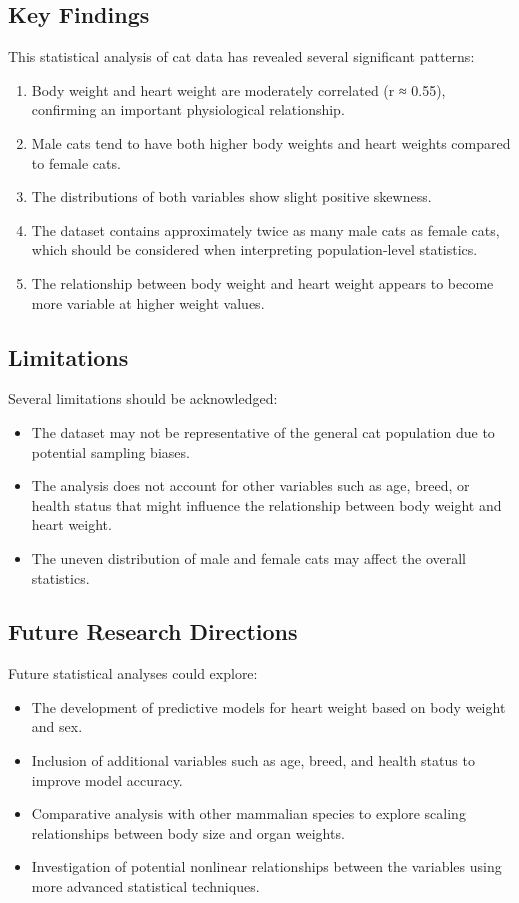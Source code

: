 \documentclass[a4paper,12pt]{article}
\begin{document}
\subsection{Key Findings}
\label{subsec:findings}

This statistical analysis of cat data has revealed several significant patterns:

\begin{enumerate}[leftmargin=1.5cm]
    \item Body weight and heart weight are moderately correlated (r ≈ 0.55), confirming an important physiological relationship.
    \item Male cats tend to have both higher body weights and heart weights compared to female cats.
    \item The distributions of both variables show slight positive skewness.
    \item The dataset contains approximately twice as many male cats as female cats, which should be considered when interpreting population-level statistics.
    \item The relationship between body weight and heart weight appears to become more variable at higher weight values.
\end{enumerate}

\subsection{Limitations}
\label{subsec:limitations}

Several limitations should be acknowledged:
\begin{itemize}[leftmargin=1.5cm]
    \item The dataset may not be representative of the general cat population due to potential sampling biases.
    \item The analysis does not account for other variables such as age, breed, or health status that might influence the relationship between body weight and heart weight.
    \item The uneven distribution of male and female cats may affect the overall statistics.
\end{itemize}

\subsection{Future Research Directions}
\label{subsec:future}

Future statistical analyses could explore:
\begin{itemize}[leftmargin=1.5cm]
    \item The development of predictive models for heart weight based on body weight and sex.
    \item Inclusion of additional variables such as age, breed, and health status to improve model accuracy.
    \item Comparative analysis with other mammalian species to explore scaling relationships between body size and organ weights.
    \item Investigation of potential nonlinear relationships between the variables using more advanced statistical techniques.
\end{itemize}
\end{document}
